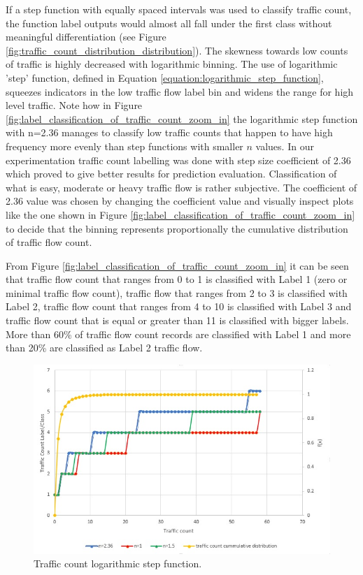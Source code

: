 \documentclass[12pt, a4paper]{report}
\theoremstyle{definition}
\theoremstyle{definition}%
\theoremstyle{definition}%
\theoremstyle{definition}%
\theoremstyle{definition}%
\theoremstyle{definition}%
\begin{document}
If a step function with equally spaced intervals was used to classify traffic count, the function label outputs would almost all fall under the first class without meaningful differentiation (see Figure \ref{fig:traffic_count_distribution_distribution}). The skewness towards low counts of traffic is highly decreased with logarithmic binning. The use of logarithmic 'step' function, defined in Equation \ref{equation:logarithmic_step_function}, squeezes indicators in the low traffic flow label bin and widens the range for high level traffic. Note how in Figure \ref{fig:label_classification_of_traffic_count_zoom_in} the logarithmic step function with n=2.36 manages to classify low traffic counts that happen to have high frequency more evenly than step functions with smaller $n$ values. In our experimentation traffic count labelling was done with step size coefficient of 2.36 which proved to give better results for prediction evaluation. Classification of what is easy, moderate or heavy traffic flow is rather subjective. The coefficient of 2.36 value was chosen by changing the coefficient value and visually inspect plots like the one shown in Figure \ref{fig:label_classification_of_traffic_count_zoom_in} to decide that the binning represents proportionally the cumulative distribution of traffic flow count. 

From Figure \ref{fig:label_classification_of_traffic_count_zoom_in} it can be seen that traffic flow count that ranges from 0 to 1 is classified with Label 1 (zero or minimal traffic flow count), traffic flow that ranges from 2 to 3 is classified with Label 2, traffic flow count that ranges from 4 to 10 is classified with Label 3 and traffic flow count that is equal or greater than 11 is classified with bigger labels. More than 60\% of traffic flow count records are classified with Label 1 and more than 20\% are classified as Label 2 traffic flow. 
 
\begin{figure}[!]	
	\includegraphics[scale=0.70]{steps_function.jpg}
	\centering
	\caption{Traffic count logarithmic step function. }
	\label{fig:label_classification_of_traffic_count}
\end{figure}
\end{document}
